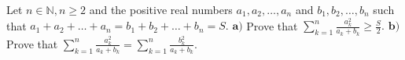 Let $n \in \mathbb{N}, n \ge 2$ and the positive real numbers $a_1,a_2,…,a_n$ and $b_1,b_2,…,b_n$ such that $a_1+a_2+…+a_n=b_1+b_2+…+b_n=S.$
$\textbf{a)}$ Prove that $\sum\limits_{k=1}^n \frac{a_k^2}{a_k+b_k} \ge \frac{S}{2}.$
$\textbf{b)}$ Prove that $\sum\limits_{k=1}^n \frac{a_k^2}{a_k+b_k}= \sum\limits_{k=1}^n \frac{b_k^2}{a_k+b_k}.$